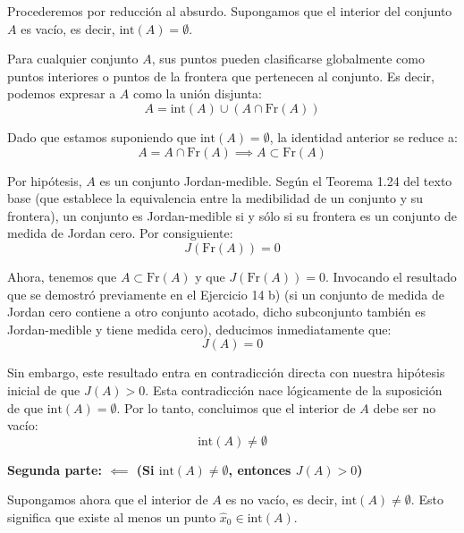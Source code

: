 \documentclass[11pt,letterpaper]{article}
\begin{document}
Procederemos por reducción al absurdo. Supongamos que el interior del conjunto $A$ es vacío, es decir, $\text{int}(A) = \emptyset$.

Para cualquier conjunto $A$, sus puntos pueden clasificarse globalmente como puntos interiores o puntos de la frontera que pertenecen al conjunto. Es decir, podemos expresar a $A$ como la unión disjunta:
\begin{equation*}
A = \text{int}(A) \cup (A \cap \text{Fr}(A))
\end{equation*}

Dado que estamos suponiendo que $\text{int}(A) = \emptyset$, la identidad anterior se reduce a:
\begin{equation*}
A = A \cap \text{Fr}(A) \implies A \subset \text{Fr}(A)
\end{equation*}

Por hipótesis, $A$ es un conjunto Jordan-medible. Según el Teorema 1.24 del texto base (que establece la equivalencia entre la medibilidad de un conjunto y su frontera), un conjunto es Jordan-medible si y sólo si su frontera es un conjunto de medida de Jordan cero. Por consiguiente:
\begin{equation*}
J(\text{Fr}(A)) = 0
\end{equation*}

Ahora, tenemos que $A \subset \text{Fr}(A)$ y que $J(\text{Fr}(A)) = 0$. Invocando el resultado que se demostró previamente en el Ejercicio 14 b) (si un conjunto de medida de Jordan cero contiene a otro conjunto acotado, dicho subconjunto también es Jordan-medible y tiene medida cero), deducimos inmediatamente que:
\begin{equation*}
J(A) = 0
\end{equation*}

Sin embargo, este resultado entra en contradicción directa con nuestra hipótesis inicial de que $J(A) > 0$. Esta contradicción nace lógicamente de la suposición de que $\text{int}(A) = \emptyset$. Por lo tanto, concluimos que el interior de $A$ debe ser no vacío:
\begin{equation*}
\text{int}(A) \neq \emptyset
\end{equation*}

\vspace{0.5cm}
\textbf{Segunda parte: $\impliedby$ (Si $\text{int}(A) \neq \emptyset$, entonces $J(A) > 0$)}

Supongamos ahora que el interior de $A$ es no vacío, es decir, $\text{int}(A) \neq \emptyset$. Esto significa que existe al menos un punto $\hat{x}_0 \in \text{int}(A)$.
\end{document}
